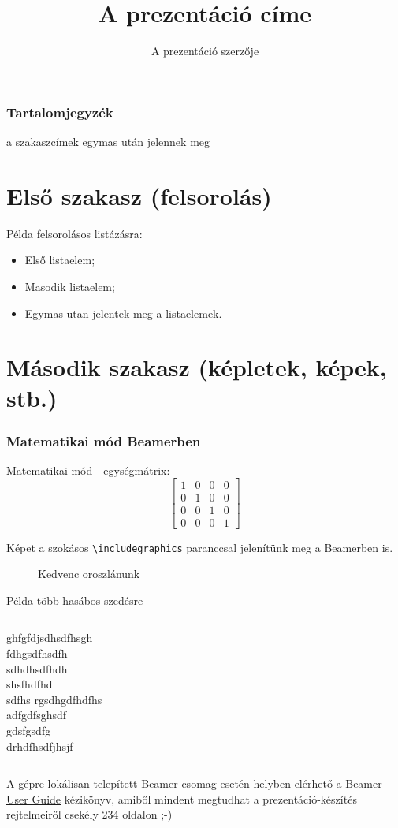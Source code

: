 \documentclass{beamer}
\title{A prezentáció címe}
\author{A prezentáció szerzője}
\institute[SZTE]{Szegedi Tudományegyetem}
\begin{document}
%	
\begin{frame}[plain] %
\titlepage
\end{frame}
%
\begin{frame}[plain] %
\frametitle{Tartalomjegyzék}
\tableofcontents[pausesections] %
a szakaszcímek egymas után jelennek meg
\end{frame}
%
\section{Első szakasz (felsorolás)}
%
\begin{frame} 
Példa felsorolásos listázásra:
\pause
\begin{itemize}
\item Első listaelem;
\pause
\item \alert{Masodik listaelem}; %
\pause
\item Egymas utan jelentek meg a listaelemek.
\end{itemize}
\end{frame}
%
\section{Második szakasz (képletek, képek, stb.)}
%
\begin{frame}
\frametitle{Matematikai mód Beamerben}
Matematikai mód - egységmátrix:
\[ \left[ 
\begin{array}{cccc}
  1&0&0&0 \\ 
  0&1&0&0 \\ 
  0&0&1&0 \\ 
  0&0&0&1 
\end{array} \right]
\]
\end{frame}
%
\begin{frame}
Képet a szokásos  \texttt{\color{blue}\textbackslash includegraphics} paranccsal jelenítünk meg a Beamerben is.
\begin{figure}
\caption{Kedvenc oroszlánunk}
\end{figure}
\end{frame}
%
\begin{frame}{Példa több hasábos szedésre}	
\begin{columns} 
  ghfgfdjsdhsdfhsgh\\fdhgsdfhsdfh\\sdhdhsdfhdh\\shsfhdfhd\\sdfhs
  rgsdhgdfhdfhs\\adfgdfsghsdf\\gdsfgsdfg\\
  drhdfhsdfjhsjf
\end{columns}
\end{frame}
%
\begin{frame}
A gépre lokálisan telepített  {\color{blue}Beamer} csomag esetén helyben elérhető a
{\color{magenta}\href{run:/usr/share/texlive/texmf-dist/doc/latex/beamer/beameruserguide.pdf}{Beamer User Guide}} kézikönyv, amiből mindent megtudhat a prezentáció-készítés rejtelmeiről csekély 234 oldalon ;-)
\end{frame}
%
\end{document}

